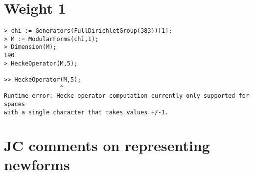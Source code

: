 \documentclass[11pt]{amsart}
\numberwithin{equation}{subsection}
\theoremstyle{definition}
\begin{document}
\section{Weight 1}

\begin{verbatim}
> chi := Generators(FullDirichletGroup(383))[1];
> M := ModularForms(chi,1);
> Dimension(M);
190
> HeckeOperator(M,5);

>> HeckeOperator(M,5);
                ^
Runtime error: Hecke operator computation currently only supported for spaces 
with a single character that takes values +/-1.
\end{verbatim}

\section{JC comments on representing newforms}
\end{document}
